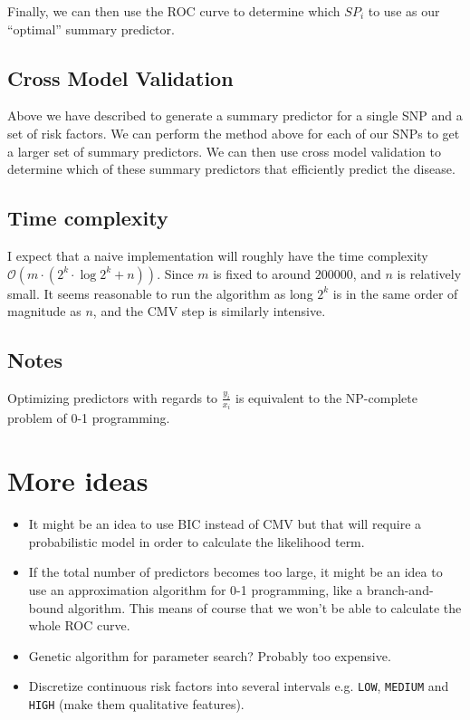 \documentclass[a4paper]{article}
\begin{document}
Finally, we can then use the ROC curve to determine which $SP_i$ to use as our ``optimal'' summary predictor.
\subsection{Cross Model Validation}
Above we have described to generate a summary predictor for a single SNP and a set of risk factors. We can perform the method above for each of our SNPs to get a larger set of summary predictors. We can then use cross model validation to determine which of these summary predictors that efficiently predict the disease.

\subsection{Time complexity}
I expect that a naive implementation will roughly have the time complexity $\mathcal{O}(m \cdot (2^k\cdot \log{2^k} + n))$. Since $m$ is fixed to around $200 000$, and $n$ is relatively small. It seems reasonable to run the algorithm as long $2^k$ is in the same order of magnitude as $n$, and the CMV step is similarly intensive.

\subsection{Notes}
Optimizing predictors with regards to $\frac{y_i}{x_i}$ is equivalent to the NP-complete problem of 0-1 programming.
\section{More ideas}
\begin{itemize}
  \item It might be an idea to use BIC instead of CMV but that will require a probabilistic model in order to calculate the likelihood term.
  \item If the total number of predictors becomes too large, it might be an idea to use an approximation algorithm for 0-1 programming, like a branch-and-bound algorithm. This means of course that we won't be able to calculate the whole ROC curve.
  \item Genetic algorithm for parameter search? Probably too expensive.
  \item Discretize continuous risk factors into several intervals e.g. \texttt{LOW}, \texttt{MEDIUM} and \texttt{HIGH} (make them qualitative features).
\end{itemize}
\end{document}
